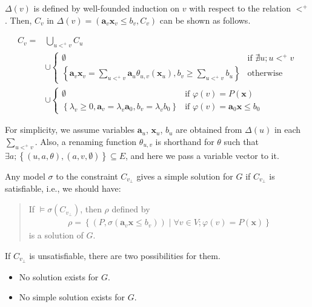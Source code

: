 \documentclass[a4paper,12pt]{article}
\begin{document}
$\Delta(v)$ is defined by well-founded induction on $v$ with respect
to the relation $<^+$. Then, $C_v$ in
$\Delta(v) = \left( \mathbf{a}_v \mathbf{x}_v \leq b_v, C_v \right)$
can be shown as follows.

\begin{align*}
C_v = & \bigcup_{u <^+ v} C_u
\\
& \cup \begin{cases}
\emptyset
& \mbox{if } \nexists u; u <^+ v \\
\left\lbrace
 \mathbf{a}_v \mathbf{x}_v = \sum_{u <^+ v} \mathbf{a}_u \theta_{u,v} (\mathbf{x}_u),
 b_v \geq \sum_{u <^+ v} b_u
\right\rbrace
& \mbox{otherwise}
\end{cases}
\\
& \cup \begin{cases}
\emptyset
& \mbox{if } \varphi(v) = P(\mathbf{x}) \\
\left\lbrace
 \lambda_v \geq 0, \mathbf{a}_v = \lambda_v \mathbf{a}_0,
 b_v = \lambda_v b_0
\right\rbrace
& \mbox{if } \varphi(v) = \mathbf{a}_0 \mathbf{x} \leq b_0
\end{cases}
\end{align*}

For simplicity, we assume variables $\mathbf{a}_u$, $\mathbf{x}_u$,
$b_u$ are obtained from $\Delta(u)$ in each $\sum_{u <^+ v}$. Also, a
renaming function $\theta_{u,v}$ is shorthand for $\theta$ such that
$\exists a; \left\lbrace (u,a,\theta), (a,v,\emptyset) \right\rbrace
\subseteq E$, and here we pass a variable vector to it.

Any model $\sigma$ to the constraint $C_{v_\bot}$ gives a simple
solution for $G$ if $C_{v_\bot}$ is satisfiable, i.e., we should have:

\begin{quote}
If $\models \sigma(C_{v_\bot})$, then $\rho$ defined by
\begin{align*}
 \rho = \left\lbrace
  \left( P, \sigma(\mathbf{a}_v \mathbf{x} \leq b_v) \right) \middle|
  \forall v \in V; \varphi(v) = P(\mathbf{x})
 \right\rbrace
\end{align*}
is a solution of $G$.
\end{quote}

If $C_{v_\bot}$ is unsatisfiable, there are two possibilities for them.

\begin{itemize}
\item No solution exists for $G$.
\item No simple solution exists for $G$.
\end{itemize}
\end{document}
